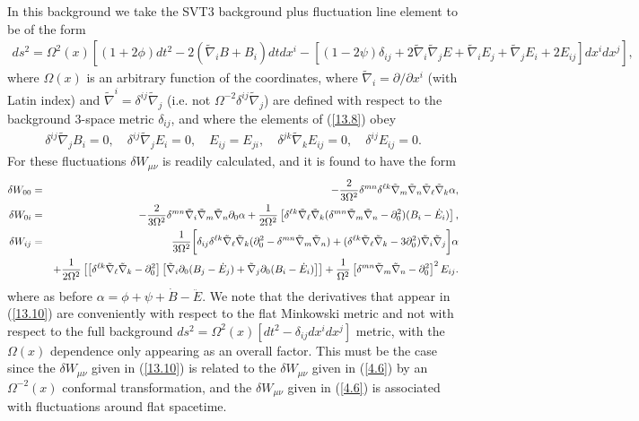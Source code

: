 \documentclass[aps,onecolumn,10pt]{revtex4}
\numberwithin{equation}{section}
\numberwithin{equation}{section}
\begin{document}
In this background we take the SVT3  background plus fluctuation line element to be of the form
%
\begin{eqnarray}
ds^2 = \Omega^2(x) \left[ (1+2\phi) dt^2 -2(\tilde{\nabla}_i B +B_i)dt dx^i - [(1-2\psi)\delta_{ij} +2\tilde{\nabla}_i\tilde{\nabla}_j E + \tilde{\nabla}_i E_j + \tilde{\nabla}_j E_i + 2E_{ij}]dx^i dx^j\right],
\label{13.8}
\end{eqnarray}
%
where $\Omega(x)$ is an arbitrary function of the coordinates, where $\tilde{\nabla}_i=\partial/\partial x^i$ (with Latin index) and  $\tilde{\nabla}^i=\delta^{ij}\tilde{\nabla}_j$ (i.e. not $\Omega^{-2}\delta^{ij}\tilde{\nabla}_j$) are defined with respect to the background 3-space metric $\delta_{ij}$, and where the elements of (\ref{13.8}) obey
%
\begin{eqnarray}
\delta^{ij}\tilde{\nabla}_j B_i = 0,\quad \delta^{ij}\tilde{\nabla}_j E_i = 0, \quad E_{ij}=E_{ji},\quad \delta^{jk}\tilde{\nabla}_kE_{ij} = 0, \quad \delta^{ij}E_{ij} = 0.
\label{13.9}
\end{eqnarray}
%
For these fluctuations $\delta W_{\mu\nu}$ is readily calculated, and it is found to have the form \cite{Amarasinghe2018} 
%
\begin{eqnarray}
\delta W_{00}  &=& -\frac{2}{3\Omega^2} \delta^{mn}\delta^{\ell k}\tilde{\nabla}_m\tilde{\nabla}_n\tilde{\nabla}_{\ell}\tilde{\nabla}_k \alpha,
\nonumber\\	
\delta W_{0i} &=&  -\frac{2}{3\Omega^2} \delta^{mn}\tilde{\nabla}_i\tilde{\nabla}_m\tilde{\nabla}_n\partial_0\alpha
	+\frac{1}{2\Omega^2}\left[\delta^{\ell k}\tilde{\nabla}_{\ell}\tilde{\nabla}_k(\delta^{mn}\tilde{\nabla}_m\tilde{\nabla}_n-\partial_0^2)(B_i - \dot{E}_i)\right],
\nonumber\\	
\delta W_{ij}  &=& \frac{1}{3\Omega^2}\bigg{[} \delta_{ij}\delta^{\ell k}\tilde{\nabla}_{\ell}\tilde{\nabla}_k (\partial_0^2 - \delta^{mn}\tilde{\nabla}_m\tilde{\nabla}_n) 
+(\delta^{\ell k}\tilde{\nabla}_{\ell}\tilde{\nabla}_k -3\partial_0^2)\tilde{\nabla}_i\tilde{\nabla}_j  
\bigg{] }\alpha
\nonumber\\
&&+\frac{1}{2\Omega^2}\left[ \left[\delta^{\ell k}\tilde{\nabla}_{\ell}\tilde{\nabla}_k -\partial_0^2\right]\left[\tilde{\nabla}_i   \partial_0(B_j - \dot{E}_j)+ \tilde{\nabla}_j \partial_0(B_i - \dot{E}_i)\right] \right]
+\frac{1}{\Omega^2}\left[\delta^{mn}\tilde{\nabla}_m\tilde{\nabla}_n-\partial_0^2\right]^2E_{ij}.
\label{13.10}
\end{eqnarray}
%
where as before $\alpha=\phi + \psi +\dot{B}-\ddot{E}$. We note that the derivatives that appear in (\ref{13.10}) are conveniently with respect to the flat Minkowski metric and not with respect to the full background $ds^2=\Omega^2(x)[dt^2-\delta_{ij}dx^idx^j]$ metric, with the $\Omega(x)$ dependence only appearing as an overall factor. This must be the case since the $\delta W_{\mu\nu}$ given in (\ref{13.10}) is related to the $\delta W_{\mu\nu}$ given in (\ref{4.6}) by an $\Omega^{-2}(x)$  conformal transformation, and the $\delta W_{\mu\nu}$ given in (\ref{4.6}) is associated with fluctuations around flat spacetime.
\end{document}
